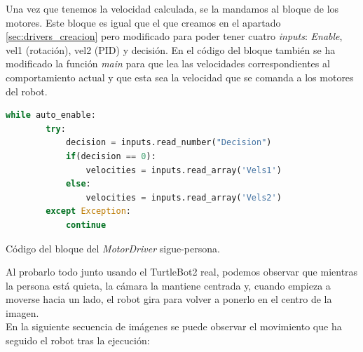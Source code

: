 Una vez que tenemos la velocidad calculada, se la mandamos al bloque de los motores. Este bloque es igual que el que creamos en el apartado
\ref{sec:drivers_creacion} pero modificado para poder tener cuatro \textit{inputs}: \textit{Enable}, vel1 (rotación), vel2 (PID) y decisión.
En el código del bloque también se ha modificado la función \textit{main} para que lea las velocidades correspondientes al comportamiento actual y
que esta sea la velocidad que se comanda a los motores del robot.\\

\begin{code}[H]
    \begin{lstlisting}[language=python]
    while auto_enable:
        try:
            decision = inputs.read_number("Decision")
            if(decision == 0):
                velocities = inputs.read_array('Vels1')
            else:
                velocities = inputs.read_array('Vels2')
        except Exception:
            continue
\end{lstlisting}
\caption[Código bloque MotorDriver sigue-persona]{Código del bloque del \textit{MotorDriver} sigue-persona.}
\label{cod:MotorDriver_FP}
\end{code}

Al probarlo todo junto usando el TurtleBot2 real, podemos observar que mientras la persona está quieta, la cámara la mantiene centrada y,
cuando empieza a moverse hacia un lado, el robot gira para volver a ponerlo en el centro de la imagen.\\

En la siguiente secuencia de imágenes se puede observar el movimiento que ha seguido el robot tras la ejecución:

